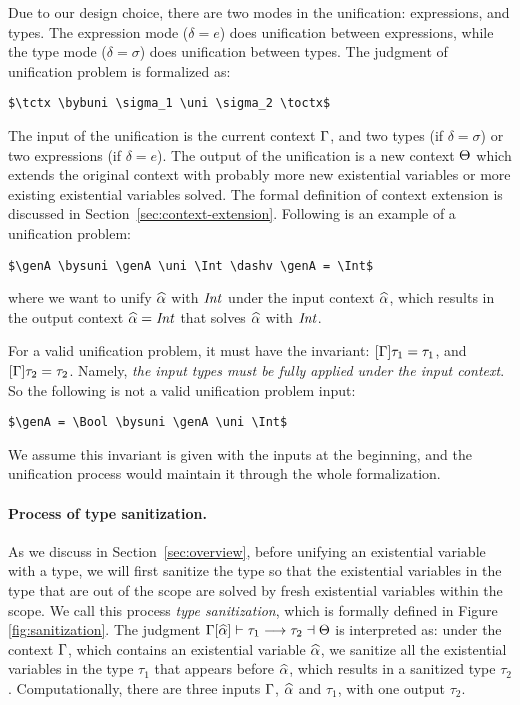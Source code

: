 Due to our design choice, there are two modes in the
unification: expressions, and types. The expression mode ($\delta = e$) does
unification between expressions, while the type mode ($\delta = \sigma$) does
unification between types.
The judgment of unification problem is formalized as:

\begin{lstlisting}
$\tctx \bybuni \sigma_1 \uni \sigma_2 \toctx$
\end{lstlisting}

The input of the unification is the current context $\Gamma$, and two types
(if $\delta = \sigma$) or two expressions (if $\delta = e$).
The output of the unification
is a new context $\Theta$ which extends the original context with probably more
new existential variables or more existing
existential variables solved.
The formal definition of context extension is discussed in
Section~\ref{sec:context-extension}.
Following is an example of a unification problem:

\begin{lstlisting}
$\genA \bysuni \genA \uni \Int \dashv \genA = \Int$
\end{lstlisting}

\noindent where we want to unify $\widehat{\alpha}$ with $\mathit{Int}$ under the input context
$\widehat{\alpha}$, which results in the output context $\widehat{\alpha} = \mathit{Int}$ that solves $\widehat{\alpha}$
with $\mathit{Int}$.

For a valid unification problem, it must have the invariant: $[\Gamma] \tau_1 =
\tau_1$, and $[\Gamma] \tau_2 = \tau_2$. Namely,
\textit{the input types must be
fully applied under the input context}.
 So the following is not a valid
unification problem input:

\begin{lstlisting}
$\genA = \Bool \bysuni \genA \uni \Int$
\end{lstlisting}

We assume this invariant is given with the inputs at the beginning,
and the unification process would maintain it through the whole
formalization.

\paragraph{Process of type sanitization.}

As we discuss in Section~\ref{sec:overview}, before unifying an existential
variable with a type, we will first sanitize the type so that the existential
variables in the type that are out of the scope are solved by fresh existential
variables within the scope. We call this process \textit{type sanitization},
which is formally defined in Figure \ref{fig:sanitization}. The judgment
$\Gamma[\widehat{\alpha}] \vdash \tau_1 \longrightarrow \tau_2 \dashv \Theta$ is interpreted as: under the
context $\Gamma$, which contains an existential variable $\widehat{\alpha}$, we sanitize all
the existential variables in the type $\tau_1$ that appears before $\widehat{\alpha}$,
which results in a sanitized type $\tau_2$. Computationally, there are three
inputs $\Gamma$, $\widehat{\alpha}$ and $\tau_1$, with one output $\tau_2$.

